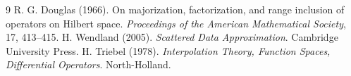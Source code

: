 \documentclass[11pt,a4paper]{article}
\theoremstyle{remark}
\begin{document}
\begin{thebibliography}{9}
R. G. Douglas (1966). On majorization, factorization, and range inclusion of operators on Hilbert space. \emph{Proceedings of the American Mathematical Society}, 17, 413--415.
H. Wendland (2005). \emph{Scattered Data Approximation}. Cambridge University Press.
H. Triebel (1978). \emph{Interpolation Theory, Function Spaces, Differential Operators}. North-Holland.
\end{thebibliography}
\end{document}
